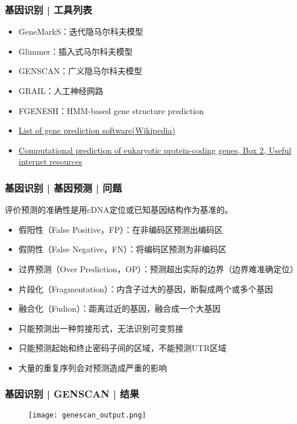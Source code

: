 \begin{frame}
  \frametitle{基因识别 | 工具列表}
  \begin{itemize}
    \item GeneMarkS：迭代隐马尔科夫模型
    \item Glimmer：插入式马尔科夫模型
    \item GENSCAN：广义隐马尔科夫模型
    \item GRAIL：人工神经网路
    \item FGENESH：HMM-based gene structure prediction
    \item \href{http://en.wikipedia.org/wiki/List\_of\_gene\_prediction\_software}{List of gene prediction software(Wikipedia)}
    \item \href{http://www.nature.com/nrg/journal/v3/n9/box/nrg890\_BX2.html}{Computational prediction of eukaryotic protein-coding genes, Box 2, Useful internet resources}
  \end{itemize}
\end{frame}

\begin{frame}
  \frametitle{基因识别 | 基因预测 | 问题}
  评价预测的准确性是用cDNA定位或已知基因结构作为基准的。
  \begin{itemize}
    \item 假阳性（False Positive，FP）：在非编码区预测出编码区
    \item 假阴性（False Negative，FN）：将编码区预测为非编码区
    \item 过界预测（Over Prediction，OP）：预测超出实际的边界（边界难准确定位）
    \item 片段化（Fragmentation）：内含子过大的基因，断裂成两个或多个基因
    \item 融合化（Fudion）：距离过近的基因，融合成一个大基因
    \item 只能预测出一种剪接形式，无法识别可变剪接
    \item 只能预测起始和终止密码子间的区域，不能预测UTR区域
    \item 大量的重复序列会对预测造成严重的影响
  \end{itemize}
\end{frame}

\begin{frame}
  \frametitle{基因识别 | GENSCAN | 结果}
  \begin{figure}
    \centering
    \texttt{[image: genescan\_output.png]}
  \end{figure}
\end{frame}

